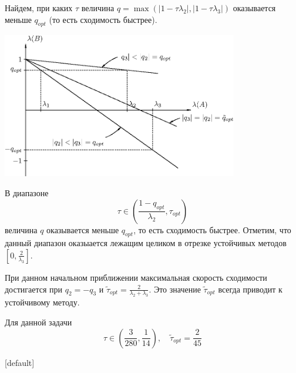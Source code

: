 \documentclass[professionalfonts,compress,unicode]{beamer}
\begin{document}
{
    Найдем, при каких $\tau$ величина 
    $q = \max(|1 - \tau \lambda_2|, |1 - \tau \lambda_3|)$ 
    оказывается меньше $q_{opt}$ (то есть сходимость быстрее).
    \begin{center}
    \includegraphics[height=2.5in]{special-1.eps}
    \end{center}
}

{
    В диапазоне 
    \begin{equation*}
        \tau \in \left(\frac{1-q_{opt}}{\lambda_2},\tau_{opt}\right)
    \end{equation*}
    величина $q$ оказывается меньше $q_{opt}$, то есть сходимость быстрее.
    Отметим, что данный диапазон оказыается лежащим целиком в 
    отрезке устойчивых методов $\left[0, \frac{2}{\lambda_3}\right]$.
    
    При данном начальном приближении максимальная скорость сходимости 
    достигается при $q_2 = -q_3$ и $\tilde{\tau}_{opt} = 
    \frac{2}{\lambda_2 + \lambda_3}$. Это значение $\tilde\tau_{opt}$
    всегда приводит к устойчивому методу.

    Для данной задачи
    \begin{equation*}
        \tau \in \left(\frac{3}{280},\frac{1}{14}\right), \quad
        \tilde{\tau}_{opt} = \frac{2}{45}
    \end{equation*}
    
}
{
[default] 
}
\end{document}
